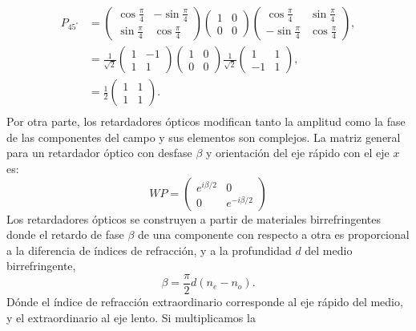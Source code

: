\begin{align*}
P_{45^{\circ}}
&=
\begin{pmatrix}
  \cos{\frac{\pi}{4}} &-\sin{\frac{\pi}{4}}\\\sin{\frac{\pi}{4}}&\cos{\frac{\pi}{4}}
\end{pmatrix}
\begin{pmatrix}
1 & 0 \\0& 0
\end{pmatrix}
\begin{pmatrix}
  \cos{\frac{\pi}{4}} &\sin{\frac{\pi}{4}}\\-\sin{\frac{\pi}{4}}&\cos{\frac{\pi}{4}}
\end{pmatrix},\\
&=
\frac{1}{\sqrt{2}}
\begin{pmatrix}
  1&-1\\1&1
\end{pmatrix}
\begin{pmatrix}
1 & 0 \\0& 0
\end{pmatrix}
\frac{1}{\sqrt{2}}
\begin{pmatrix}
1 &1\\-1&1
\end{pmatrix},\\
&=
\frac{1}{2}
\begin{pmatrix}
1 &1\\1&1
\end{pmatrix}.\\
\end{align*}
Por otra parte, los retardadores ópticos modifican tanto la amplitud
como la fase de las componentes del campo y sus elementos son
complejos. La matriz general para un retardador óptico con desfase
$\beta $ y orientación del eje rápido con el eje
$x$ es:
\begin{equation}
WP = 
\begin{pmatrix}
e^{i\beta/2} & 0 \\0&e^{-i\beta/2}  
\end{pmatrix}
\label{eq:retarder}
\end{equation}
Los retardadores ópticos se construyen a partir de materiales
birrefringentes donde el retardo de fase $\beta$ de una componente con respecto a otra es
proporcional a la diferencia de índices de refracción, y a la
profundidad $d$ del medio birrefringente,
$$\beta= \frac{\pi}{2}d\left(n_e-n_o\right).$$ 
Dónde el índice de refracción extraordinario corresponde al eje rápido
del medio, y el extraordinario al eje lento. Si multiplicamos la
